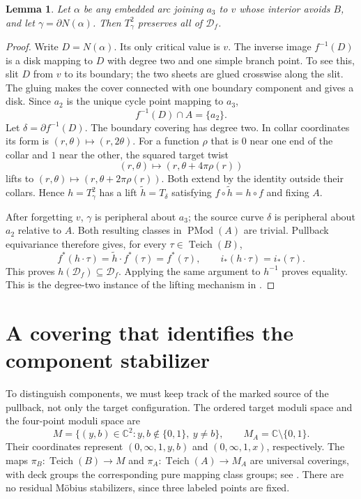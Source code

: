 \documentclass[11pt]{article}
\newcommand{\C}{\mathbb C}
\newcommand{\Teich}{\operatorname{Teich}}
\newcommand{\Mod}{\operatorname{PMod}}
\newcommand{\D}{\mathcal D}
\newtheorem{lemma}[theorem]{Lemma}
\theoremstyle{remark}
\begin{document}
\begin{lemma}\label{lem:preserve}
Let $\alpha$ be any embedded arc joining $a_3$ to $v$ whose interior avoids $B$, and let $\gamma=\partial N(\alpha)$. Then $T_\gamma^2$ preserves all of $\D_f$.
\end{lemma}
\begin{proof}
Write $D=N(\alpha)$. Its only critical value is $v$. The inverse image $f^{-1}(D)$ is a disk mapping to $D$ with degree two and one simple branch point. To see this, slit $D$ from $v$ to its boundary; the two sheets are glued crosswise along the slit. The gluing makes the cover connected with one boundary component and gives a disk. Since $a_2$ is the unique cycle point mapping to $a_3$,
\[
 f^{-1}(D)\cap A=\{a_2\}.
\]
Let $\delta=\partial f^{-1}(D)$. The boundary covering has degree two. In collar coordinates its form is $(r,\theta)\mapsto(r,2\theta)$. For a function $\rho$ that is $0$ near one end of the collar and $1$ near the other, the squared target twist
\[
 (r,\theta)\longmapsto(r,\theta+4\pi\rho(r))
\]
lifts to $(r,\theta)\mapsto(r,\theta+2\pi\rho(r))$. Both extend by the identity outside their collars. Hence $h=T_\gamma^2$ has a lift $\widetilde h=T_\delta$ satisfying $f\circ\widetilde h=h\circ f$ and fixing $A$.

After forgetting $v$, $\gamma$ is peripheral about $a_3$; the source curve $\delta$ is peripheral about $a_2$ relative to $A$. Both resulting classes in $\Mod(A)$ are trivial. Pullback equivariance therefore gives, for every $\tau\in\Teich(B)$,
\[
 f^*(h\cdot\tau)=\widetilde h\cdot f^*(\tau)=f^*(\tau),
 \qquad i_*(h\cdot\tau)=i_*(\tau).
\]
This proves $h(\D_f)\subseteq\D_f$. Applying the same argument to $h^{-1}$ proves equality. This is the degree-two instance of the lifting mechanism in \cite[Lemmas 5.3 and 5.5]{FKS}.
\end{proof}

\section{A covering that identifies the component stabilizer}
To distinguish components, we must keep track of the marked source of the pullback, not only the target configuration. The ordered target moduli space and the four-point moduli space are
\[
 M=\{(y,b)\in\C^2:y,b\notin\{0,1\},\ y\ne b\},\qquad
 M_A=\C\setminus\{0,1\}.
\]
Their coordinates represent $(0,\infty,1,y,b)$ and $(0,\infty,1,x)$, respectively. The maps $\pi_B:\Teich(B)\to M$ and $\pi_A:\Teich(A)\to M_A$ are universal coverings, with deck groups the corresponding pure mapping class groups; see \cite[Section 2.3]{HK}. There are no residual M\"obius stabilizers, since three labeled points are fixed.
\end{document}
